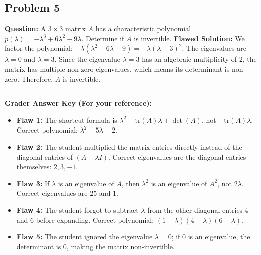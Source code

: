 \documentclass[11pt, a4paper]{article}
\theoremstyle{definition}
\theoremstyle{remark}
\begin{document}
\subsection{Problem 5}
\textbf{Question:} A $3 \times 3$ matrix $A$ has a characteristic polynomial $p(\lambda) = -\lambda^3 + 6\lambda^2 - 9\lambda$. Determine if $A$ is invertible.
\textbf{Flawed Solution:}
We factor the polynomial: $-\lambda(\lambda^2 - 6\lambda + 9) = -\lambda(\lambda - 3)^2$.
The eigenvalues are $\lambda = 0$ and $\lambda = 3$.
Since the eigenvalue $\lambda = 3$ has an algebraic multiplicity of 2, the matrix has multiple non-zero eigenvalues, which means its determinant is non-zero. Therefore, $A$ is invertible.

\vspace{1cm}
\hrule
\vspace{0.5cm}
\textbf{Grader Answer Key (For your reference):}
\begin{itemize}
    \item \textbf{Flaw 1:} The shortcut formula is $\lambda^2 - \text{tr}(A)\lambda + \det(A)$, not $+ \text{tr}(A)\lambda$. Correct polynomial: $\lambda^2 - 5\lambda - 2$.
    \item \textbf{Flaw 2:} The student multiplied the matrix entries directly instead of the diagonal entries of $(A - \lambda I)$. Correct eigenvalues are the diagonal entries themselves: $2, 3, -1$.
    \item \textbf{Flaw 3:} If $\lambda$ is an eigenvalue of $A$, then $\lambda^2$ is an eigenvalue of $A^2$, not $2\lambda$. Correct eigenvalues are $25$ and $1$.
    \item \textbf{Flaw 4:} The student forgot to subtract $\lambda$ from the other diagonal entries $4$ and $6$ before expanding. Correct polynomial: $(1-\lambda)(4-\lambda)(6-\lambda)$.
    \item \textbf{Flaw 5:} The student ignored the eigenvalue $\lambda = 0$; if $0$ is an eigenvalue, the determinant is $0$, making the matrix non-invertible.
\end{itemize}
\end{document}
